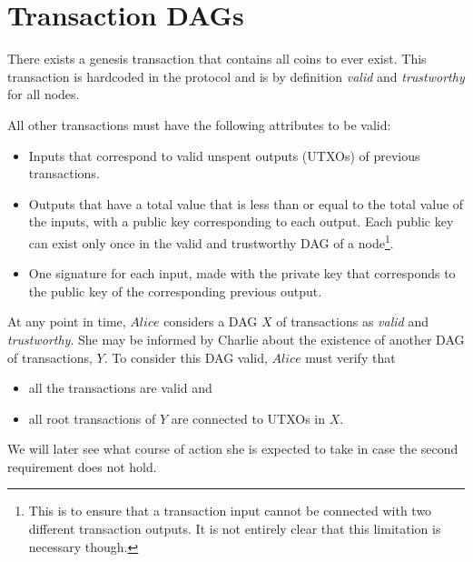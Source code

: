 \section{Transaction DAGs}
  There exists a genesis transaction that contains all coins to ever exist. This
  transaction is hardcoded in the protocol and is by definition \textit{valid} and
  \textit{trustworthy} for all nodes.
  \begin{center}
    \begin{dot2tex}[outputdir=dot2tex/, file=coinbase]
      
    \end{dot2tex}
  \end{center}
  All other transactions must have the following attributes to be valid:
  \begin{itemize}
    \item Inputs that correspond to valid unspent outputs (UTXOs) of previous
    transactions.
    \item Outputs that have a total value that is less than or equal to the total value of
      the inputs, with a public key corresponding to each output. Each public key can
      exist only once in the valid and trustworthy DAG of a node\footnote{This is to
      ensure that a transaction input cannot be connected with two different transaction
      outputs. It is not entirely clear that this limitation is necessary though.}.
    \item One signature for each input, made with the private key that corresponds to the
      public key of the corresponding previous output.
  \end{itemize}
  At any point in time, $Alice$ considers a DAG $X$ of transactions as \textit{valid} and
  \textit{trustworthy}. She may be informed by Charlie about the existence of another DAG
  of transactions, $Y$. To consider this DAG valid, $Alice$ must verify that
  \begin{itemize}
    \item all the transactions are valid and
    \item all root transactions of $Y$ are connected to UTXOs in $X$.
  \end{itemize}
  We will later see what course of action she is expected to take in case the second
  requirement does not hold.

